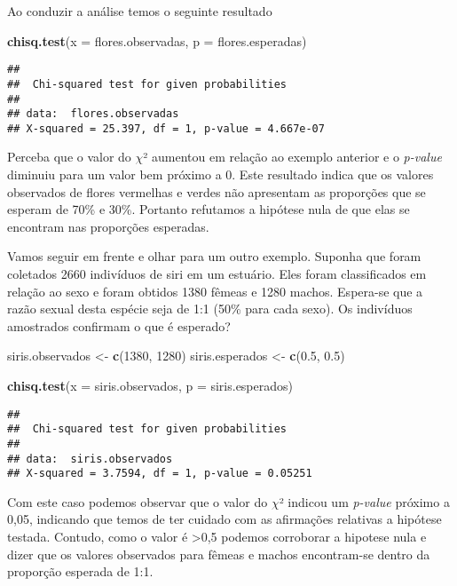 \documentclass[14pt,titlepage, oneside, openany, a4paper]{book}
\newenvironment{Shaded}{\begin{snugshade}}{\end{snugshade}}
\newcommand{\DataTypeTok}[1]{\textcolor[rgb]{0.13,0.29,0.53}{#1}}
\newcommand{\DecValTok}[1]{\textcolor[rgb]{0.00,0.00,0.81}{#1}}
\newcommand{\FloatTok}[1]{\textcolor[rgb]{0.00,0.00,0.81}{#1}}
\newcommand{\KeywordTok}[1]{\textcolor[rgb]{0.13,0.29,0.53}{\textbf{#1}}}
\newcommand{\NormalTok}[1]{#1}
\newcommand{\StringTok}[1]{\textcolor[rgb]{0.31,0.60,0.02}{#1}}
\begin{document}
Ao conduzir a análise temos o seguinte resultado

\begin{Shaded}
\begin{Highlighting}[]
\KeywordTok{chisq.test}\NormalTok{(}\DataTypeTok{x =}\NormalTok{ flores.observadas, }\DataTypeTok{p =}\NormalTok{ flores.esperadas)}
\end{Highlighting}
\end{Shaded}

\begin{verbatim}
## 
##  Chi-squared test for given probabilities
## 
## data:  flores.observadas
## X-squared = 25.397, df = 1, p-value = 4.667e-07
\end{verbatim}

Perceba que o valor do \(\chi\)² aumentou em relação ao exemplo anterior e o \emph{p-value} diminuiu para um valor bem próximo a 0. Este resultado indica que os valores observados de flores vermelhas e verdes não apresentam as proporções que se esperam de 70\% e 30\%. Portanto refutamos a hipótese nula de que elas se encontram nas proporções esperadas.

Vamos seguir em frente e olhar para um outro exemplo. Suponha que foram coletados 2660 indivíduos de siri em um estuário. Eles foram classificados em relação ao sexo e foram obtidos 1380 fêmeas e 1280 machos. Espera-se que a razão sexual desta espécie seja de 1:1 (50\% para cada sexo). Os indivíduos amostrados confirmam o que é esperado?

\begin{Shaded}
\begin{Highlighting}[]
\NormalTok{siris.observados <-}\StringTok{ }\KeywordTok{c}\NormalTok{(}\DecValTok{1380}\NormalTok{, }\DecValTok{1280}\NormalTok{)}
\NormalTok{siris.esperados <-}\StringTok{ }\KeywordTok{c}\NormalTok{(}\FloatTok{0.5}\NormalTok{, }\FloatTok{0.5}\NormalTok{)}

\KeywordTok{chisq.test}\NormalTok{(}\DataTypeTok{x =}\NormalTok{ siris.observados, }\DataTypeTok{p =}\NormalTok{ siris.esperados)}
\end{Highlighting}
\end{Shaded}

\begin{verbatim}
## 
##  Chi-squared test for given probabilities
## 
## data:  siris.observados
## X-squared = 3.7594, df = 1, p-value = 0.05251
\end{verbatim}

Com este caso podemos observar que o valor do \(\chi\)² indicou um \emph{p-value} próximo a 0,05, indicando que temos de ter cuidado com as afirmações relativas a hipótese testada. Contudo, como o valor é \textgreater{}0,5 podemos corroborar a hipotese nula e dizer que os valores observados para fêmeas e machos encontram-se dentro da proporção esperada de 1:1.
\end{document}
